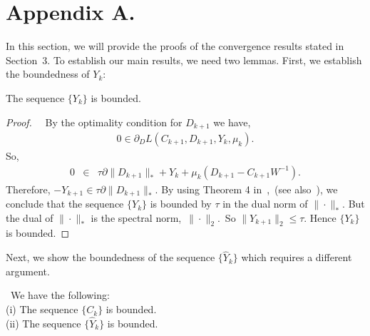 \documentclass[twoside,11pt]{article}
\begin{document}
\section*{Appendix A.}
In this section, we will provide the proofs of the convergence results stated in Section~3. 
\label{app:theorem}
To establish our main results, we need two lemmas. First, we establish the boundedness of $Y_k$: 
\begin{lemma}\label{theorem_3_1}
	The sequence $\{Y_k\}$ is bounded.
\end{lemma}
\begin{proof}~~By the optimality condition for $D_{k+1}$ we have,
\begin{align*}0 \in \partial_DL(C_{k+1},D_{k+1},Y_k,\mu_k).\end{align*}
	So,
	\begin{eqnarray*}
		0 &\in& \tau\partial\|D_{k+1}\|_{\ast} +Y_k +\mu_k(D_{k+1} -C_{k+1}W^{-1}).
	\end{eqnarray*}
	Therefore,
	$-Y_{k+1} \in \tau\partial\|D_{k+1}\|_{\ast}.$
	By using Theorem 4 in~\citep{LinChenMa},~(see also~\citet{watson}), we conclude that the sequence $\{Y_k\}$ is bounded by $\tau$ in the dual norm of $\|\cdot\|_*$. But the dual of $\|\cdot\|_*$ is the spectral norm,~$\|\cdot\|_2$.~So $\|Y_{k+1}\|_2\le\tau$. Hence $\{Y_k\}$ is bounded.
\end{proof}
Next, we show the boundedness of the sequence $\{\hat{Y}_{k}\}$ which requires a different argument.
\begin{lemma}\label{theorem_3_2}~We have the following:\\
		(i) The sequence $\{C_k\}$ is bounded.\\
		(ii) The sequence $\{\hat{Y}_{k}\}$ is bounded.
\end{lemma}
\end{document}
